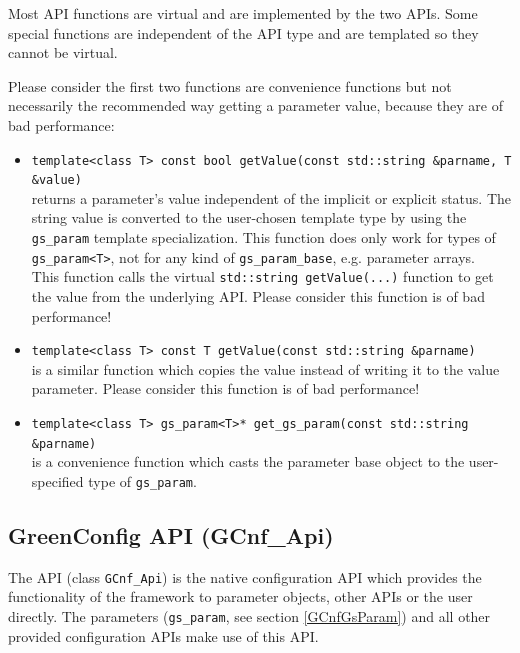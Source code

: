Most API functions are virtual and are implemented by the two APIs. Some special functions are independent of the API type and are templated so they cannot be virtual.

Please consider the first two functions are convenience functions but not necessarily the recommended way getting a parameter value, because they are of bad performance:

\begin{itemize}
    \item \lstinline|template<class T> const bool getValue(const std::string &parname, T &value)| \\
    	returns a parameter's value independent of the implicit or explicit status. The string value is converted to the user-chosen template type by using the \lstinline|gs_param| template specialization. This function does only work for types of \lstinline|gs_param<T>|, not for any kind of \lstinline|gs_param_base|, e.g. parameter arrays. \\
	This function calls the virtual \lstinline|std::string getValue(...)| function to get the value from the underlying API. Please consider this function is of bad performance!

    \item  \lstinline|template<class T> const T getValue(const std::string &parname)| \\
    	is a similar function which copies the value instead of writing it to the value parameter. Please consider this function is of bad performance!

    \item \lstinline|template<class T> gs_param<T>* get_gs_param(const std::string &parname)| \\
    	is a convenience function which casts the parameter base object to the user-specified type of \lstinline|gs_param|.

\end{itemize}

\subsection{GreenConfig API (GCnf\_Api)}
\label{GCnf API}\label{GCnfApi}
The \GreenConfig API (class \lstinline|GCnf_Api|) is the native \GreenControl configuration API which provides the functionality of the framework to parameter objects, other APIs or the user directly. The \GreenConfig parameters (\lstinline|gs_param|, see section \ref{GCnfGsParam}) and all other provided configuration APIs make use of this API.

